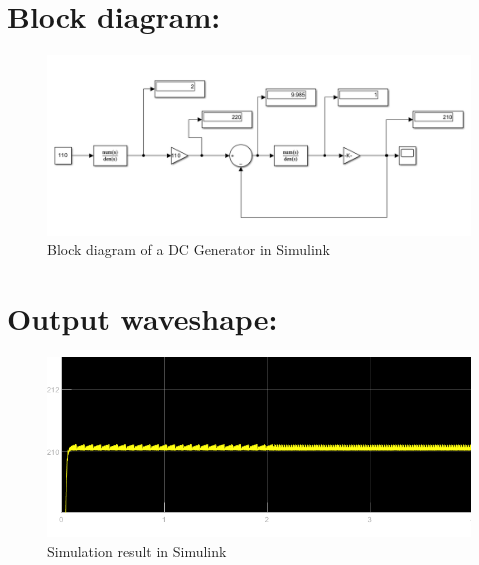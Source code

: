 \documentclass[a4paper,12pt]{article}
\begin{document}
		\section*{Block diagram:}
	\begin{figure}[H]
		\centering
		\includegraphics[width=1\linewidth]{"Images/1"}
		\caption{Block diagram of a DC Generator in Simulink }
		\label{fig:screenshot-2025-04-26-063416}
	\end{figure}
	\newpage
	\section*{Output waveshape:}
		\begin{figure}[H]
		\centering
		\includegraphics[width=1\linewidth]{"Images/sim"}
		\caption{Simulation result in Simulink}
		\label{fig:screenshot-2025-04-26-063416}
	\end{figure}
\end{document}
